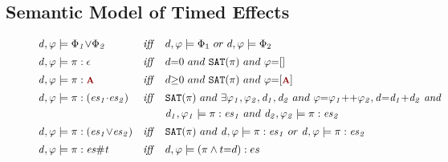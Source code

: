 \documentclass[acmsmall,10pt,review]{acmart}
\newcommand{\es}{\textcolor{black}{\ensuremath{{es}}}}
\newcommand{\effect}{\textcolor{black}{\ensuremath{\mathrm{\Phi}}}}
\newcommand{\anyevent}[1]{{\textcolor{darkred}
{{\textbf{\footnotesize #1}}}}}
\newcommand{\code}[1]{{\tt{\ensuremath{\m{#1}}}}}
\newcommand{\empt}{\textcolor{black}{\ensuremath{\epsilon}}}
\newcommand{\m}{\mathit}
\begin{document}
{\subsection{Semantic Model of Timed Effects}
\label{subsec:Specification_Semantics}





\begin{figure}[ht]
    \vspace{-1mm}
    \renewcommand{\arraystretch}{1}
\begin{align*} 
&\code{d, \varphi \models \effect_1 {\vee} \effect_2}  
&\m{iff}\quad 
&  d, \varphi \models \effect_1 \ or \ d, \varphi \models \effect_2
\\[0.2em]
&\code{d, \varphi \models \pi : \empt }  
&\m{iff}\quad 
&  d{=}0 \ and\  {\tt{SAT}(\pi)}  \ and \ \varphi {=} [] 
\\[0.2em]
&\code{d, \varphi \models  \pi : \anyevent{A} }  &\m{iff}\quad 
& d {\geq} 0 \ and\ {\tt{SAT}(\pi)}  \ and \ 
\varphi {=} \code{[\anyevent{A}]}
  \\[0.2em]
&\code{d, \varphi \models  \pi : (\es_1{\cdot}\es_2)}  
&\m{iff}\quad 
& {\tt{SAT}(\pi)}  \ and \ \exists \code{\varphi_1, \varphi_2, d_1, d_2}\ and\ \code{
\varphi {=} \varphi_1 {+}{+} \varphi_2, d {=} d_1 {+} d_2 \ and 
}\\
& & &
\code{d_1, \varphi_1 \models  \pi : \es_1}  \ and \ 
\code{d_2, \varphi_2 \models  \pi : \es_2}  
 \\[0.2em]
&\code{d, \varphi \models  \pi : (\es_1 {\vee} \es_2)}  
&\m{iff}\quad 
& {\tt{SAT}(\pi)}  \ and \ \code{d, \varphi \models  \pi :  \es_1 } \ or \ 
 \code{d, \varphi \models  \pi :  \es_2}  
\\[0.2em]
&\code{d, \varphi \models  \pi : \es \# t }  
&\m{iff}\quad 
& d, \varphi \models  (\pi \wedge t{=}d) : \es

\end{align*}
\end{figure}}
\end{document}
